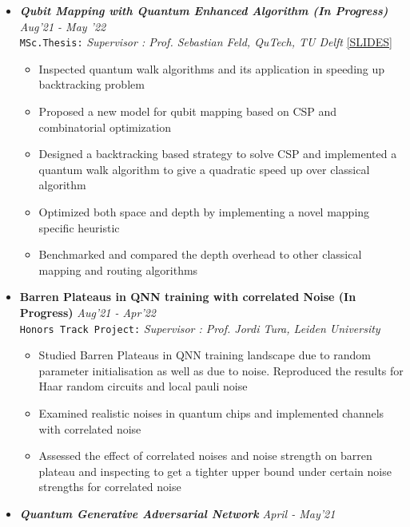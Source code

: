 \documentclass[11pt,a4paper]{article}
\begin{document}
\begin{itemize}
    \item \textbf{\textit{Qubit Mapping with Quantum Enhanced Algorithm (In Progress)}} \hfill \textit{Aug'21 - May '22}\\
    \texttt{MSc.Thesis:} \textit{Supervisor : Prof. Sebastian Feld, QuTech, TU Delft} \hfill \href{https://github.com/smitchaudhary/thesis-presentation/blob/master/defense.pdf}{[SLIDES]}
    \begin{itemize}
        \item Inspected quantum walk algorithms and its application in speeding up backtracking problem
        \item Proposed a new model for qubit mapping based on CSP
and combinatorial optimization
        \item Designed a backtracking based strategy to solve CSP and implemented a quantum walk algorithm to give a quadratic speed up over classical algorithm
        \item Optimized both space and depth by implementing a novel mapping specific heuristic
        \item Benchmarked and compared the depth overhead to other
classical mapping and routing algorithms
    \end{itemize}
    \vspace{0.1cm}
    \item \textbf{Barren Plateaus in QNN training with correlated Noise (In Progress)} \hfill \textit{Aug'21 - Apr'22} \\
    \texttt{Honors Track Project:} \textit{Supervisor : Prof. Jordi Tura, Leiden University}
    \begin{itemize}
        \item Studied Barren Plateaus in QNN training landscape due to random parameter initialisation as well as due to noise. Reproduced the results for Haar random circuits and local pauli noise
        \item Examined realistic noises in quantum chips and implemented channels with correlated noise
        \item Assessed the effect of correlated noises and noise strength on barren plateau and inspecting to get a tighter upper bound under certain noise strengths for correlated noise
    \end{itemize}
	\vspace{0.1cm}
    \item \textbf{\textit{Quantum Generative Adversarial Network}} \hfill \textit{April - May'21}\\

\end{itemize}
\end{document}
